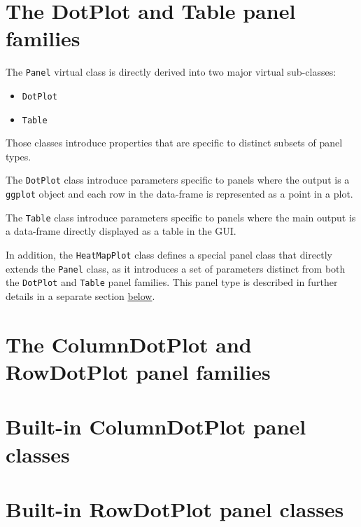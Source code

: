 \documentclass[]{book}
\providecommand{\tightlist}{%
  \setlength{\itemsep}{0pt}\setlength{\parskip}{0pt}}
\begin{document}
\hypertarget{the-dotplot-and-table-panel-families}{%
\section{The DotPlot and Table panel families}\label{the-dotplot-and-table-panel-families}}

The \texttt{Panel} virtual class is directly derived into two major virtual sub-classes:

\begin{itemize}
\tightlist
\item
  \texttt{DotPlot}
\item
  \texttt{Table}
\end{itemize}

Those classes introduce properties that are specific to distinct subsets of panel types.

The \texttt{DotPlot} class introduce parameters specific to panels where the output is a \texttt{ggplot} object and each row in the data-frame is represented as a point in a plot.

The \texttt{Table} class introduce parameters specific to panels where the main output is a data-frame directly displayed as a table in the GUI.

In addition, the \texttt{HeatMapPlot} class defines a special panel class that directly extends the \texttt{Panel} class, as it introduces a set of parameters distinct from both the \texttt{DotPlot} and \texttt{Table} panel families.
This panel type is described in further details in a separate section \protect\hyperlink{heatmapplot-class}{below}.

\hypertarget{the-columndotplot-and-rowdotplot-panel-families}{%
\section{The ColumnDotPlot and RowDotPlot panel families}\label{the-columndotplot-and-rowdotplot-panel-families}}

\hypertarget{built-in-columndotplot-panel-classes}{%
\section{Built-in ColumnDotPlot panel classes}\label{built-in-columndotplot-panel-classes}}

\hypertarget{built-in-rowdotplot-panel-classes}{%
\section{Built-in RowDotPlot panel classes}\label{built-in-rowdotplot-panel-classes}}
\end{document}
